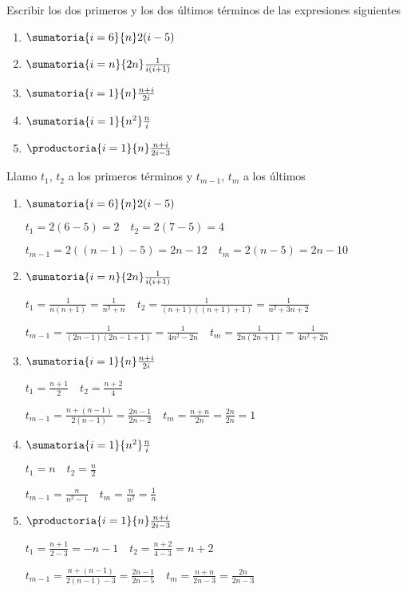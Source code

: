 \begin{enunciado}{\ejercicio}

  Escribir los dos primeros y los dos últimos términos de las expresiones siguientes
  \begin{multicols}{5}
    \begin{enumerate}[label=\roman*)]
      \item $\sumatoria{i=6}{n} 2(i - 5)$
      \item $\sumatoria{i=n}{2n} \frac{1}{i(i+1)}$
      \item $\sumatoria{i=1}{n} \frac{n + i}{2i}$
      \item $\sumatoria{i=1}{n^2} \frac{n}{i}$
      \item $\productoria{i=1}{n} \frac{n + i}{2i - 3}$
    \end{enumerate}
  \end{multicols}

\end{enunciado}
Llamo $t_1$, $t_2$ a los primeros términos y $t_{m-1}$, $t_m$ a los últimos\\

\begin{enumerate}[label=\roman*)]
  \item $\sumatoria{i=6}{n}2(i - 5)$\par

        $t_1 = 2(6 - 5) = 2 \quad t_2 = 2(7 - 5) = 4$\par
        $t_{m-1} = 2((n - 1) - 5) = 2n - 12 \quad t_m = 2(n - 5) = 2n - 10$

  \item $\sumatoria{i=n}{2n} \frac{1}{i(i+1)}$\par
        $t_1 = \frac{1}{n(n + 1)} = \frac{1}{n^2 + n} \quad t_2 = \frac{1}{(n+1)((n+1) + 1)} = \frac{1}{n^2 + 3n + 2}$\par
        $t_{m-1} = \frac{1}{(2n-1)(2n-1+1)} = \frac{1}{4n^2-2n} \quad t_m = \frac{1}{2n(2n+1)} = \frac{1}{4n^2 + 2n}$

  \item $\sumatoria{i=1}{n} \frac{n + i}{2i}$\par
        $t_1 = \frac{n + 1}{2} \quad t_2 = \frac{n + 2}{4}$\par
        $t_{m-1} = \frac{n + (n-1)}{2(n-1)} = \frac{2n - 1}{2n - 2} \quad t_m = \frac{n + n}{2n} = \frac{2n}{2n} = 1$

  \item $\sumatoria{i=1}{n^2} \frac{n}{i}$\par
        $t_1 = n \quad t_2 = \frac{n}{2}$\par
        $t_{m-1} = \frac{n}{n^2 - 1} \quad t_m = \frac{n}{n^2} = \frac{1}{n}$

  \item $\productoria{i=1}{n} \frac{n + i}{2i - 3}$\par
        $t_1 = \frac{n + 1}{2 - 3} = - n - 1 \quad t_2 = \frac{n + 2}{4 - 3} = n + 2$\par
        $t_{m-1} = \frac{n + (n-1)}{2(n-1) - 3} = \frac{2n - 1}{2n - 5} \quad t_m = \frac{n + n}{2n - 3} = \frac{2n}{2n - 3}$
\end{enumerate}

